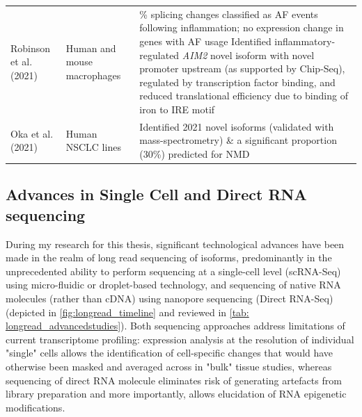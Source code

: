 \begin{landscape}
\begin{longtable}[c]{p{4cm}p{4cm}p{18cm}}
		
		\centering Robinson et al. (2021) \cite{Robinson2021} &
		\centering Human and mouse macrophages &
		\tabitem 50\% splicing changes classified as AF events following inflammation; no expression change in genes with AF usage \newline 
		\tabitem Identified inflammatory-regulated \textit{AIM2} novel isoform with novel promoter upstream (as supported by Chip-Seq), regulated by transcription factor binding, and reduced translational efficiency due to binding of iron to IRE motif \\
		\hdashline[0.5pt/5pt]
		
		\centering Oka et al. (2021) \cite{Oka2021} &
		\centering Human NSCLC lines &
		\tabitem Identified 2021 novel isoforms (validated with mass-spectrometry) \& a significant proportion (30\%) predicted for NMD \\* \bottomrule
	\end{longtable}
\end{landscape}
\restoregeometry



\subsection{Advances in Single Cell and Direct RNA sequencing}
During my research for this thesis, significant technological advances have been made in the realm of long read sequencing of isoforms, predominantly in the unprecedented ability to perform sequencing at a single-cell level (scRNA-Seq) using micro-fluidic or droplet-based technology, and sequencing of native RNA molecules (rather than cDNA) using nanopore sequencing (Direct RNA-Seq) (depicted in \cref{fig:longread_timeline} and reviewed in \cref{tab: longread_advancedstudies}). Both sequencing approaches address limitations of current transcriptome profiling: expression analysis at the resolution of individual "single" cells allows the identification of cell-specific changes that would have otherwise been masked and averaged across in "bulk" tissue studies, whereas sequencing of direct RNA molecule eliminates risk of generating artefacts from library preparation and more importantly, allows elucidation of RNA epigenetic modifications\cite{Bayega2018}. 

